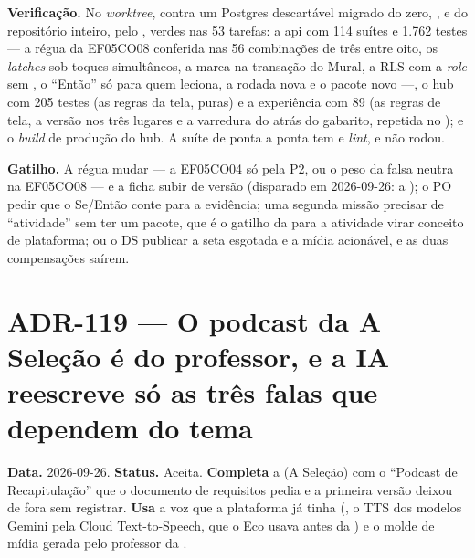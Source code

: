 \textbf{Verificação.} No \emph{worktree}, contra um Postgres descartável migrado
do zero, ,  e  do repositório inteiro, pelo
, verdes nas 53 tarefas: a api com 114 suítes e 1.762 testes --- a régua da EF05CO08 conferida
nas 56 combinações de três entre oito, os \emph{latches} sob toques
simultâneos, a marca na transação do Mural, a RLS com a \emph{role} sem
, o \enquote{Então} só para quem leciona, a rodada nova e o
pacote novo ---, o hub com 205 testes (as regras da tela, puras) e a experiência
com 89 (as regras de tela, a versão nos três lugares e a varredura do 
atrás do gabarito, repetida no ); e o \emph{build} de produção do
hub. A suíte de ponta a ponta tem  e \emph{lint}, e não
rodou.

\textbf{Gatilho.} A régua mudar --- a EF05CO04 só pela P2, ou o peso da falsa
neutra na EF05CO08 --- e a ficha subir de versão (disparado em 2026-09-26: a
); o
PO pedir que o Se/Então conte para a evidência; uma segunda missão precisar de
\enquote{atividade} sem ter um pacote, que é o gatilho da  para a
atividade virar conceito de plataforma; ou o DS publicar a seta esgotada e a
mídia acionável, e as duas compensações saírem.

\section{ADR-119 --- O podcast da A Seleção é do professor, e a IA reescreve só as três falas que dependem do tema}
\label{adr:a-selecao-podcast}

\textbf{Data.} 2026-09-26. \textbf{Status.} Aceita.
\textbf{Completa} a  (A Seleção) com o \enquote{Podcast de
Recapitulação} que o documento de requisitos pedia e a primeira versão deixou
de fora sem registrar. \textbf{Usa} a voz que a plataforma já tinha
(, o TTS dos modelos Gemini pela Cloud Text-to-Speech, que o
Eco usava antes da ) e o molde de mídia gerada pelo professor da
.

